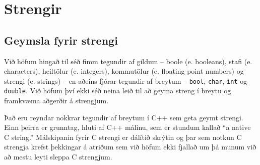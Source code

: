 





\chapter{Strengir}
\label{strings}

\section{Geymsla fyrir strengi}

Við höfum hingað til séð fimm tegundir af gildum -- boole (e. booleans), stafi (e. characters), heiltölur (e. integers),
kommutölur (e. floating-point numbers) og strengi (e. strings) -- en aðeins fjórar tegundir af breytum -- {\tt bool}, {\tt char}, {\tt int} og {\tt double}.
Við höfum því ekki séð neina leið til að geyma streng í breytu og framkvæma aðgerðir á strengjum.

Það eru reyndar nokkrar tegundir af breytum í C++ sem geta geymt strengi.
Einn þeirra er grunntag, hluti af C++ málinu, sem er stundum kallað ``a native C string.''
Málskipanin fyrir C strengi er dálítið skrýtin og þar sem notkun C strengja krefst þekkingar á atriðum sem við höfum ekki fjallað um þá munum við að mestu leyti sleppa C strengjum.

